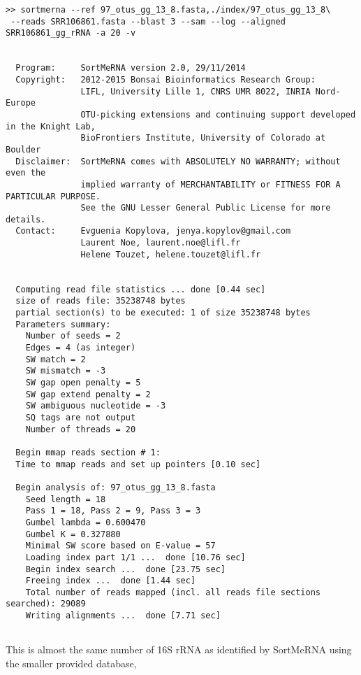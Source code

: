 \documentclass[10pt,a4paper]{article}
\begin{document}
\begin{Verbatim}[fontsize=\footnotesize]
>> sortmerna --ref 97_otus_gg_13_8.fasta,./index/97_otus_gg_13_8\
 --reads SRR106861.fasta --blast 3 --sam --log --aligned SRR106861_gg_rRNA -a 20 -v 


  Program:     SortMeRNA version 2.0, 29/11/2014
  Copyright:   2012-2015 Bonsai Bioinformatics Research Group:
               LIFL, University Lille 1, CNRS UMR 8022, INRIA Nord-Europe
               OTU-picking extensions and continuing support developed in the Knight Lab,
               BioFrontiers Institute, University of Colorado at Boulder
  Disclaimer:  SortMeRNA comes with ABSOLUTELY NO WARRANTY; without even the
               implied warranty of MERCHANTABILITY or FITNESS FOR A PARTICULAR PURPOSE.
               See the GNU Lesser General Public License for more details.
  Contact:     Evguenia Kopylova, jenya.kopylov@gmail.com 
               Laurent Noe, laurent.noe@lifl.fr
               Helene Touzet, helene.touzet@lifl.fr


  Computing read file statistics ... done [0.44 sec]
  size of reads file: 35238748 bytes
  partial section(s) to be executed: 1 of size 35238748 bytes 
  Parameters summary:
    Number of seeds = 2
    Edges = 4 (as integer)
    SW match = 2
    SW mismatch = -3
    SW gap open penalty = 5
    SW gap extend penalty = 2
    SW ambiguous nucleotide = -3
    SQ tags are not output
    Number of threads = 20

  Begin mmap reads section # 1:
  Time to mmap reads and set up pointers [0.10 sec]

  Begin analysis of: 97_otus_gg_13_8.fasta
    Seed length = 18
    Pass 1 = 18, Pass 2 = 9, Pass 3 = 3
    Gumbel lambda = 0.600470
    Gumbel K = 0.327880
    Minimal SW score based on E-value = 57
    Loading index part 1/1 ...  done [10.76 sec]
    Begin index search ...  done [23.75 sec]
    Freeing index ...  done [1.44 sec]
    Total number of reads mapped (incl. all reads file sections searched): 29089
    Writing alignments ...  done [7.71 sec]
              
\end{Verbatim}

This is almost the same number of 16S rRNA as identified by SortMeRNA using the smaller provided database,
\end{document}
